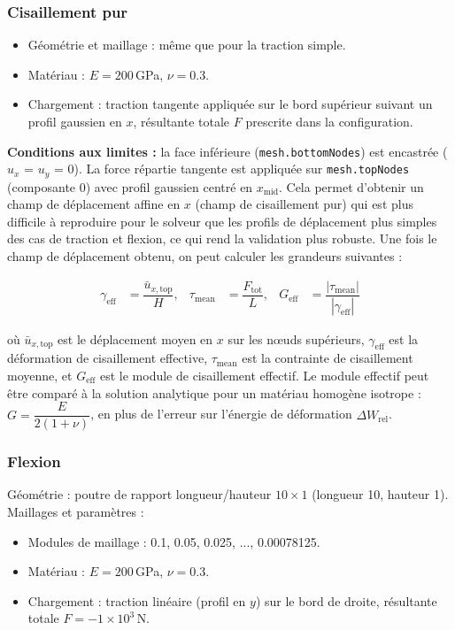 \documentclass[a4paper,11pt]{article}
\begin{document}
\subsubsection{Cisaillement pur}
\begin{itemize}
    \item Géométrie et maillage : même que pour la traction simple.
    \item Matériau : $E=200\,$GPa, $\nu=0.3$.
    \item Chargement : traction tangente appliquée sur le bord supérieur suivant un profil gaussien en $x$, résultante totale $F$ prescrite dans la configuration.
\end{itemize}

\textbf{Conditions aux limites :} la face inférieure (\texttt{mesh.bottomNodes}) est encastrée ($u_x$ = $u_y$ = 0). La force répartie tangente est appliquée sur \texttt{mesh.topNodes} (composante 0) avec profil gaussien centré en $x_{\mathrm{mid}}$. Cela permet d'obtenir un champ de déplacement affine en $x$ (champ de cisaillement pur) qui est plus difficile à reproduire pour le solveur que les profils de déplacement plus simples des cas de traction et flexion, ce qui rend la validation plus robuste. Une fois le champ de déplacement obtenu, on peut calculer les grandeurs suivantes :

\begin{align}
\gamma_{\mathrm{eff}} &= \dfrac{\bar{u}_{x,\mathrm{top}}}{H}, & \tau_{\mathrm{mean}} &= \dfrac{F_{\mathrm{tot}}}{L}, &
G_{\mathrm{eff}} &= \dfrac{|\tau_{\mathrm{mean}}|}{|\gamma_{\mathrm{eff}}|}
\end{align}

où $\bar{u}_{x,\mathrm{top}}$ est le déplacement moyen en $x$ sur les nœuds supérieurs, $\gamma_{\mathrm{eff}}$ est la déformation de cisaillement effective, $\tau_{\mathrm{mean}}$ est la contrainte de cisaillement moyenne, et $G_{\mathrm{eff}}$ est le module de cisaillement effectif. Le module effectif peut être comparé à la solution analytique pour un matériau homogène isotrope : $G = \dfrac{E}{2(1+\nu)}$, en plus de l'erreur sur l'énergie de déformation $\Delta W_{\mathrm{rel}}$.

\subsubsection{Flexion}
Géométrie : poutre de rapport longueur/hauteur $10\times1$ (longueur 10, hauteur 1). Maillages et paramètres :
\begin{itemize}
    \item Modules de maillage : 0.1, 0.05, 0.025, ..., 0.00078125.
    \item Matériau : $E=200\,$GPa, $\nu=0.3$.
    \item Chargement : traction linéaire (profil en $y$) sur le bord de droite, résultante totale $F = -1\times10^{3}\,$N.
\end{itemize}
\end{document}
